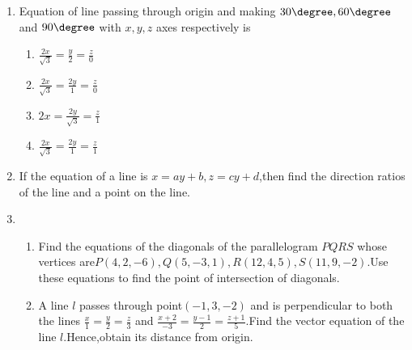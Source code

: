 \begin{enumerate}
    \item Equation of line passing through origin and making $30\degree,60\degree$ and $90\degree$ with $x,y,z$ axes respectively is
    \begin{enumerate}
        \item $\frac{2x}{\sqrt3}=\frac{y}{2}=\frac{z}{0}$
        \item $\frac{2x}{\sqrt3}=\frac{2y}{1}=\frac{z}{0}$
        \item $2x=\frac{2y}{\sqrt3}=\frac{z}{1}$
        \item $\frac{2x}{\sqrt3}=\frac{2y}{1}=\frac{z}{1}$
    \end{enumerate}
    \item If the equation of a line is $x=ay+b,z=cy+d$,then find the direction ratios of the line and a point on the line.
    \item
    \begin{enumerate}
        \item Find the equations of the diagonals of the parallelogram $PQRS$ whose vertices are$P(4,2,-6),Q(5,-3,1),R(12,4,5),S(11,9,-2)$.Use these equations to find the point of intersection of diagonals.  
        \item A line $l$ passes through point$(-1,3,-2)$ and is perpendicular to both the lines $\frac{x}{1}=\frac{y}{2}=\frac{z}{3}$ and $\frac{x+2}{-3}=\frac{y-1}{2}=\frac{z+1}{5}$.Find the vector equation of the line $l$.Hence,obtain its distance from origin.
    \end{enumerate}
   
   
   
\end{enumerate}

